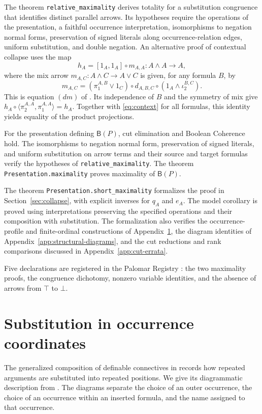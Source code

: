 \documentclass[11pt]{article}
\newcommand{\B}{\mathsf B}
\begin{document}
The theorem \texttt{relative\_maximality} derives totality for a
substitution congruence that identifies distinct parallel arrows.
Its hypotheses require the operations of the presentation, a faithful
occurrence interpretation, isomorphisms to negation normal forms,
preservation of signed literals along occurrence-relation edges,
uniform substitution, and double negation. An alternative proof
of contextual collapse uses the map
\[
 h_A=[1_A,1_A]\circ m_{A,A}:A\wedge A\longrightarrow A,
\]
where the mix arrow $m_{A,C}:A\wedge C\to A\vee C$ is given, for any
formula $B$, by
\[
 m_{A,C}=(\pi_1^{A,B}\vee1_C)\circ d_{A,B,C}
              \circ(1_A\wedge\iota_2^{B,C}).
\]
This is equation $(dm)$ of \cite[\S11.1, p.~234]{DP}.
Its independence of $B$ and the symmetry of mix give
$h_A\circ\langle\pi_2^{A,A},\pi_1^{A,A}\rangle=h_A$.
Together with \eqref{eq:context} for all formulas, this identity yields
equality of the product projections.

For the presentation defining $\B(P)$, cut elimination and Boolean
Coherence hold. The isomorphisms to negation normal form, preservation
of signed literals, and uniform substitution on arrow terms and their
source and target formulas verify the hypotheses of
\texttt{relative\_maximality}. The theorem
\texttt{Presentation.maximality} proves maximality of $\B(P)$.

The theorem \texttt{Presentation.short\_maximality} formalizes the proof
in Section~\ref{sec:collapse}, with explicit inverses for $q_A$ and $e_A$.
The model corollary is proved using interpretations preserving the
specified operations and their composition with substitution. The formalization
also verifies the occurrence-profile and finite-ordinal constructions of
Appendix~\ref{app:substitution}, the diagram identities of
Appendix~\ref{app:structural-diagrams}, and the cut reductions and rank
comparisons discussed in Appendix~\ref{app:cut-errata}.

Five declarations are registered in the Palomar Registry
\cite{palomar-2026-10-30-000014-v1}:
the two maximality proofs, the congruence dichotomy, nonzero variable
identities, and the absence of arrows from $\top$ to $\bot$.

\appendix
\section{Substitution in occurrence coordinates}\label{app:substitution}

The generalized composition of definable connectives in
\cite[\S2.5, pp.~45--46]{DP} records how repeated arguments are
substituted into repeated positions. We give its diagrammatic description
from \cite[\S\S9.2--9.3]{Notation}. The diagrams separate the choice of
an outer occurrence, the choice of an occurrence within an inserted
formula, and the name assigned to that occurrence.
\end{document}
